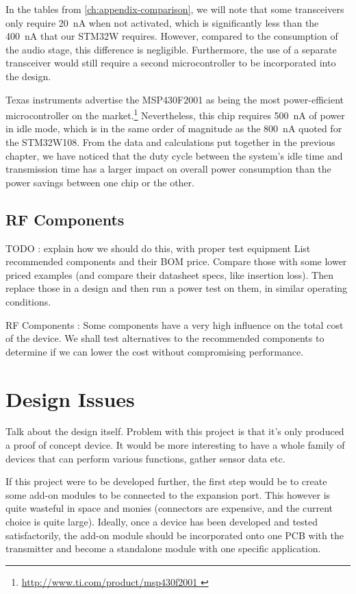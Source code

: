 In the tables from \autoref{ch:appendix-comparison}, we will note that some
transceivers only require \SI{20}{nA} when not activated, which is significantly
less than the \SI{400}{nA} that our STM32W requires. However, compared to the
consumption of the audio stage, this difference is negligible. Furthermore, the
use of a separate transceiver would still require a second microcontroller to be
incorporated into the design.

Texas instruments advertise the MSP430F2001 as being the most power-efficient
microcontroller on the market.\footnote{ \url{
http://www.ti.com/product/msp430f2001 } } Nevertheless, this chip requires
\SI{500}{nA} of power in idle mode, which is in the same order of magnitude as
the \SI{800}{nA} quoted for the STM32W108. From the data and calculations put
together in the previous chapter, we have noticed that the duty cycle between
the system's idle time and transmission time has a larger impact on overall
power consumption than the power savings between one chip or the other.

\subsection{RF Components}



TODO : explain how we should do this, with proper test equipment
List recommended components and their BOM price. Compare those with some lower
priced examples (and compare their datasheet specs, like insertion loss). Then
replace those in a design and then run a power test on them, in similar
operating conditions.

RF Components : Some components have a very high influence on the
    total cost of the device. We shall test alternatives to the recommended
    components to determine if we can lower the cost without compromising
    performance.




\section{Design Issues}

Talk about the design itself. Problem with this project is that it's only
produced a proof of concept device. It would be more interesting to have a whole
family of devices that can perform various functions, gather sensor data etc.

If this project were to be developed further, the first step would be to create
some add-on modules to be connected to the expansion port. This however is quite
wasteful in space and monies (connectors are expensive, and the current choice
is quite large). Ideally, once a device has been developed and tested
satisfactorily, the add-on module should be incorporated onto one PCB with the
transmitter and become a standalone module with one specific application.

